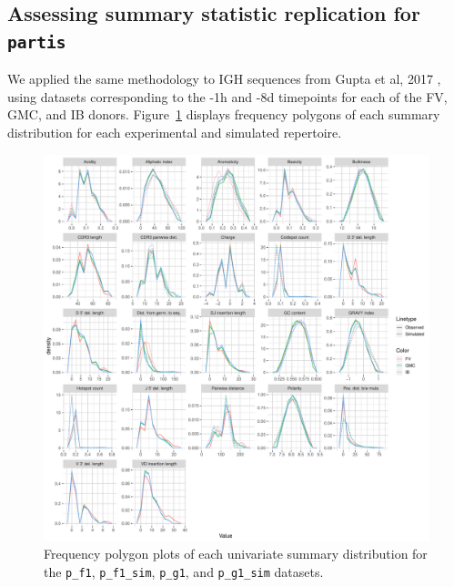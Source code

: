 \documentclass{article}
\newcommand{\partis}{\texttt{partis}}
\begin{document}
\subsection*{Assessing summary statistic replication for \partis}
We applied the same methodology to IGH sequences from Gupta et al, 2017 \cite{Gupta2017-ve}, using datasets corresponding to the -1h and -8d timepoints for each of the FV, GMC, and IB donors.
Figure~\ref{fig:PartisFreqPolys} displays frequency polygons of each summary distribution for each experimental and simulated repertoire.
\begin{figure}
    \includegraphics[width=\linewidth]{Figures/PartisScores/partis_freqpoly.pdf}
    \caption{Frequency polygon plots of each univariate summary distribution for the \texttt{p\_f1}, \texttt{p\_f1\_sim}, \texttt{p\_g1}, and \texttt{p\_g1\_sim} datasets.}
    \label{fig:PartisFreqPolys}
\end{figure}
\end{document}
